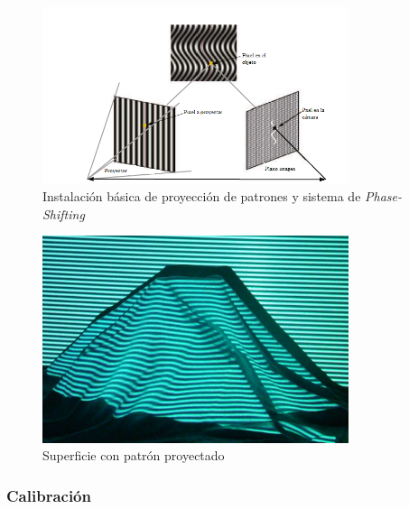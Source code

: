 \begin{figure}[H]
  \centering
    \includegraphics[width=0.8\textwidth]{./Cap2_videomapping/diagramaLS.png}
  \caption[Recent progresses on real-time 3D shape measurement using digital fringe projection techniques]{Instalación básica de proyección de patrones y sistema de \emph{Phase-Shifting}}
  \label{fig:phase21}
\end{figure}
\begin{figure}[H]
  \centering
    \includegraphics[width=0.8\textwidth]{./Cap2_videomapping/phase2.jpg}
  \caption[Imagen propia.]{Superficie con patrón proyectado}
  \label{fig:phase2}
\end{figure}

\subsubsection{Calibración}

